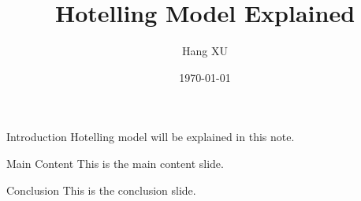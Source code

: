 \documentclass{beamer}
\title{Hotelling Model Explained}
\author{Hang XU}
\institute{Hong Kong University of Science and Technology}
\date{\today}
\begin{document}
\begin{frame}
    \titlepage
\end{frame}

\begin{frame}{Introduction}
    Hotelling model will be explained in this note.
\end{frame}

\begin{frame}{Main Content}
    This is the main content slide.
\end{frame}

\begin{frame}{Conclusion}
    This is the conclusion slide.
\end{frame}
\end{document}

